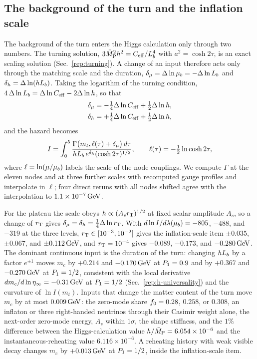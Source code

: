 \subsection{The background of the turn and the inflation scale}
\label{sec:rb-background}

The background of the turn enters the Higgs calculation only through two numbers.
The turning solution, $3\bar M_{\mathrm{P}}^2h^2=C_{\rm eff}/L_b^4$ with $a^2=\cosh2\tau$, is an exact scaling solution (Sec.~\ref{rep:turning}).
A change of an input therefore acts only through the matching scale and the duration, $\delta_\mu=\Delta\ln\mu_b=-\Delta\ln L_b$ and $\delta_h=\Delta\ln(hL_b)$.
Taking the logarithm of the turning condition, $4\,\Delta\ln L_b=\Delta\ln C_{\rm eff}-2\Delta\ln h$, so that
\begin{align}
\delta_\mu&=-\tfrac14\Delta\ln C_{\rm eff}+\tfrac12\Delta\ln h,\nonumber\\
\delta_h&=+\tfrac14\Delta\ln C_{\rm eff}+\tfrac12\Delta\ln h,
\label{eq:rb-background}
\end{align}
and the hazard becomes
\begin{equation}
I=\int_0^5\frac{\Gamma\bigl(m_t,\ell(\tau)+\delta_\mu\bigr)\,d\tau}{hL_b\,e^{\delta_h}(\cosh2\tau)^{1/2}},\qquad \ell(\tau)=-\tfrac12\ln\cosh2\tau,
\label{eq:rb-Ishift}
\end{equation}
where $\ell=\ln(\mu/\mu_b)$ labels the scale of the node couplings.
We compute $\Gamma$ at the eleven nodes and at three further scales with recomputed gauge profiles and interpolate in $\ell$; four direct reruns with all nodes shifted agree with the interpolation to $1.1\times10^{-7}\,\mathrm{GeV}$. %

For the plateau the scale obeys $h\propto(A_sr_{\mathrm{T}})^{1/2}$ at fixed scalar amplitude $A_s$, so a change of $r_{\mathrm{T}}$ gives $\delta_\mu=\delta_h=\frac14\Delta\ln r_{\mathrm{T}}$.
With $d\ln I/d\lambda(\mu_b)=-805$, $-488$, and $-319$ at the three levels, $r_{\mathrm{T}}\in[10^{-3},10^{-2}]$ gives the inflation-scale item $\pm0.035$, $\pm0.067$, and $\pm0.112\,\mathrm{GeV}$, and $r_{\mathrm{T}}=10^{-4}$ gives $-0.089$, $-0.173$, and $-0.280\,\mathrm{GeV}$. %
The dominant continuous input is the duration of the turn: changing $hL_b$ by a factor $e^{\pm1}$ moves $m_c$ by $+0.214$ and $-0.170\,\mathrm{GeV}$ at $P_1=0.9$ and by $+0.367$ and $-0.270\,\mathrm{GeV}$ at $P_1=1/2$, consistent with the local derivative $dm_c/d\ln\eta_\infty=-0.31\,\mathrm{GeV}$ at $P_1=1/2$ (Sec.~\ref{rep:h-universality}) and the curvature of $\ln I(m_t)$. %
Inputs that change the matter content of the turn move $m_c$ by at most $0.009\,\mathrm{GeV}$: the zero-mode share $f_0=0.28$, $0.258$, or $0.308$, an inflaton or three right-handed neutrinos through their Casimir weight alone, the next-order zero-mode energy, $A_s$ within $1\sigma$, the shape stiffness, and the $1\%$ difference between the Higgs-calculation value $h/\bar M_{\mathrm{P}}=6.054\times10^{-6}$ and the instantaneous-reheating value $6.116\times10^{-6}$. %
A reheating history with weak visible decay changes $m_c$ by $+0.013\,\mathrm{GeV}$ at $P_1=1/2$, inside the inflation-scale item. %

